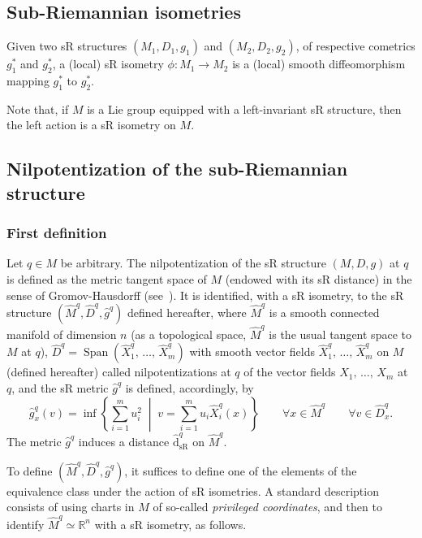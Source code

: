 \documentclass[AHL,Unicode,published]{cedram}
\newcommand*\R{\mathbb{R}}
\DeclareMathOperator{\Span}{Span}
\newcommand{\hatdsR}{\widehat{\mathrm{d}}_{\mathrm{sR}}}
\let\oldforall\forall
\renewcommand*{\forall}{\mathrel{\oldforall}}
\begin{document}
\subsection{Sub-Riemannian isometries}
Given two sR structures $(M_1,D_1,g_1)$ and $(M_2,D_2,g_2)$, of respective cometrics $g^*_1$ and $g^*_2$, a (local) sR isometry $\phi:M_1\rightarrow M_2$ is a (local) smooth diffeomorphism mapping $g^*_1$ to $g^*_2$.



Note that, if $M$ is a Lie group equipped with a left-invariant sR structure, then the left action is a sR isometry on $M$.


\subsection{Nilpotentization of the sub-Riemannian structure}\label{sec:nilp}
\subsubsection{First definition}
Let $q\in M$ be arbitrary. The nilpotentization of the sR structure $(M,D,g)$ at $q$ is defined as the metric tangent space of $M$ (endowed with its sR distance) in the sense of Gromov-Hausdorff (see~\cite{Bellaiche,Gromov}). It is identified, with a sR isometry, to the sR structure $(\widehat{M}^{q},\widehat{D}^{q},\widehat{g}^{q})$ defined hereafter, where $\widehat{M}^{q}$ is a smooth connected manifold of dimension $n$ (as a topological space, $\widehat{M}^{q}$ is the usual tangent space to $M$ at $q$), $\widehat{D}^{q}=\Span(\widehat{X}^{q}_1,\,\ldots,\,\widehat{X}^{q}_m)$ with smooth vector fields $\widehat{X}^{q}_1,\,\ldots,\,\widehat{X}^{q}_m$ on $M$ (defined hereafter) called nilpotentizations at $q$ of the vector fields $X_1,\,\ldots,\,X_m$ at $q$, and the sR metric $\widehat{g}^{q}$ is defined, accordingly, by
\[
\widehat{g}^{q}_x(v) = \inf \left\{ \sum_{i=1}^m u_i^2 \; \middle| \; v = \sum_{i=1}^m u_i \widehat{X}^{q}_i(x) \right\}\qquad \forall x\in \widehat{M}^{q}\qquad \forall v\in \widehat{D}^{q}_x.
\]
The metric $\widehat{g}^{q}$ induces a distance $\hatdsR^{q}$ on $\widehat{M}^{q}$.

To define $(\widehat{M}^{q},\widehat{D}^{q},\widehat{g}^{q})$, it suffices to define one of the elements of the equivalence class under the action of sR isometries. A standard description consists of using charts in $M$ of so-called \emph{privileged coordinates}, and then to identify $\widehat{M}^{q}\simeq\R^n$ with a sR isometry, as follows.
\end{document}

